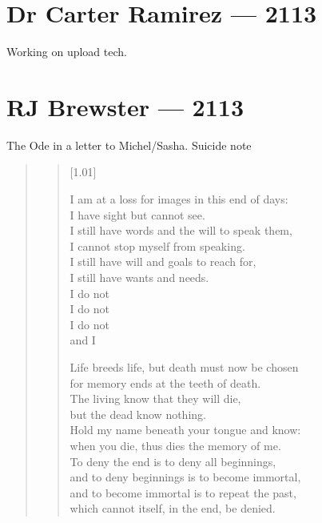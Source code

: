 \chapter*{Dr Carter Ramirez — 2113}

Working on upload tech.

\chapter*{RJ Brewster — 2113}

The Ode in a letter to Michel/Sasha. Suicide note

\begin{quote}

  \begin{verse}[1.01\textwidth]

    I am at a loss for images in this end of days:\\
    I have sight but cannot see.\\
    I still have words and the will to speak them,\\
    I cannot stop myself from speaking.\\
    I still have will and goals to reach for,\\
    I still have wants and needs.\\
    I do not\\
    I do not\\
    I do not\\
    and I

    Life breeds life, but death must now be chosen\\
    for memory ends at the teeth of death.\\
    The living know that they will die,\\
    but the dead know nothing.\\
    Hold my name beneath your tongue and know:\\
    when you die, thus dies the memory of me.\\
    To deny the end is to deny all beginnings,\\
    and to deny beginnings is to become immortal,\\
    and to become immortal is to repeat the past,\\
    which cannot itself, in the end, be denied.



\end{verse}
\end{quote}
